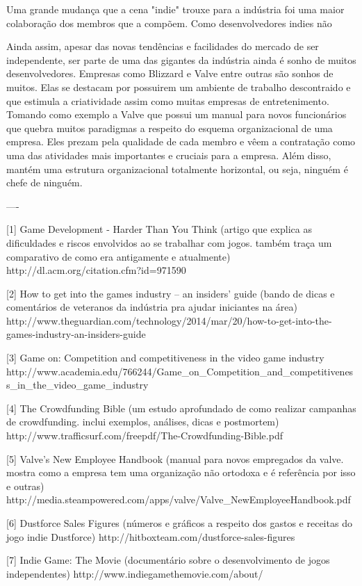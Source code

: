 Uma grande mudança que a cena "indie" trouxe para a indústria foi uma maior colaboração dos membros que a compõem. Como desenvolvedores indies não

Ainda assim, apesar das novas tendências e facilidades do mercado de ser independente, ser parte de uma das gigantes da indústria ainda é sonho de muitos desenvolvedores. Empresas como Blizzard e Valve entre outras são sonhos de muitos. Elas se destacam por possuirem um ambiente de trabalho descontraido e que estimula a criatividade assim como muitas empresas de entretenimento. Tomando como exemplo a Valve que possui um manual para novos funcionários que quebra muitos paradigmas a respeito do esquema organizacional de uma empresa. Eles prezam pela qualidade de cada membro e vêem a contratação como uma das atividades mais importantes e cruciais para a empresa. Além disso, mantém uma estrutura organizacional totalmente horizontal, ou seja, ninguém é chefe de ninguém.

----

[1] Game Development - Harder Than You Think
(artigo que explica as dificuldades e riscos envolvidos ao se trabalhar com jogos. também traça um comparativo de como era antigamente e atualmente)
http://dl.acm.org/citation.cfm?id=971590

[2] How to get into the games industry – an insiders' guide
(bando de dicas e comentários de veteranos da indústria pra ajudar iniciantes na área)
http://www.theguardian.com/technology/2014/mar/20/how-to-get-into-the-games-industry-an-insiders-guide

[3] Game on: Competition and competitiveness in the video game industry
http://www.academia.edu/766244/Game_on_Competition_and_competitiveness_in_the_video_game_industry

[4] The Crowdfunding Bible
(um estudo aprofundado de como realizar campanhas de crowdfunding. inclui exemplos, análises, dicas e postmortem)
http://www.trafficsurf.com/freepdf/The-Crowdfunding-Bible.pdf

[5] Valve's New Employee Handbook
(manual para novos empregados da valve. mostra como a empresa tem uma organização não ortodoxa e é referência por isso e outras)
http://media.steampowered.com/apps/valve/Valve_NewEmployeeHandbook.pdf

[6] Dustforce Sales Figures
(números e gráficos a respeito dos gastos e receitas do jogo indie Dustforce)
http://hitboxteam.com/dustforce-sales-figures

[7] Indie Game: The Movie
(documentário sobre o desenvolvimento de jogos independentes)
http://www.indiegamethemovie.com/about/
